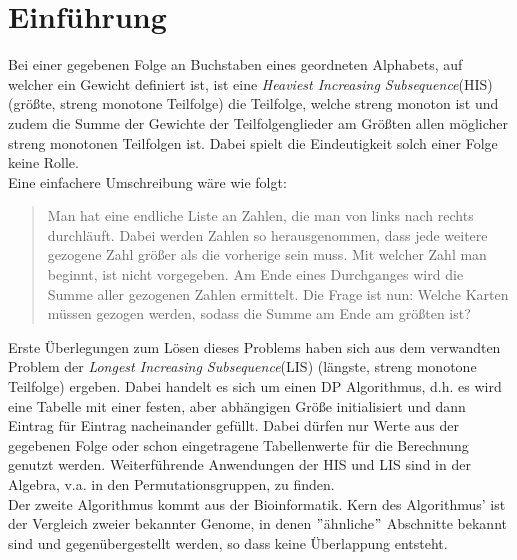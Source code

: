 \section{Einführung}

Bei einer gegebenen Folge an Buchstaben eines geordneten Alphabets, auf welcher ein Gewicht definiert ist, ist eine \textit{Heaviest
Increasing Subsequence}(HIS) (größte, streng monotone Teilfolge) die Teilfolge, welche streng monoton ist und zudem die Summe der Gewichte der Teilfolgenglieder am Größten allen möglicher streng monotonen Teilfolgen ist. Dabei spielt die Eindeutigkeit solch einer Folge keine Rolle.\\
Eine einfachere Umschreibung wäre wie folgt:
\begin{quote}
    \small Man hat eine endliche Liste an Zahlen, die man von links nach rechts durchläuft. Dabei werden Zahlen so herausgenommen, dass jede weitere gezogene Zahl größer als die vorherige sein muss. Mit welcher Zahl man beginnt, ist nicht vorgegeben. Am Ende eines Durchganges wird die Summe aller gezogenen Zahlen ermittelt. Die Frage ist nun: Welche Karten müssen gezogen werden, sodass die Summe am Ende am größten ist?
    \end{quote}
Erste Überlegungen zum Lösen dieses Problems haben sich aus dem verwandten Problem der \textit{Longest Increasing Subsequence}(LIS) (längste, streng monotone Teilfolge) ergeben. Dabei handelt es sich um einen DP Algorithmus, d.h. es wird eine Tabelle mit einer festen, aber abhängigen Größe initialisiert und dann Eintrag für Eintrag nacheinander gefüllt. Dabei dürfen nur Werte aus der gegebenen Folge oder schon eingetragene Tabellenwerte für die Berechnung genutzt werden. Weiterführende Anwendungen der HIS und LIS sind in der Algebra, v.a. in den Permutationsgruppen, zu finden\cite{schensted1961longest}.\\
Der zweite Algorithmus kommt aus der Bioinformatik. Kern des Algorithmus' ist der Vergleich zweier bekannter Genome, in denen $"$ähnliche$"$ Abschnitte bekannt sind und gegenübergestellt werden, so dass keine Überlappung entsteht.